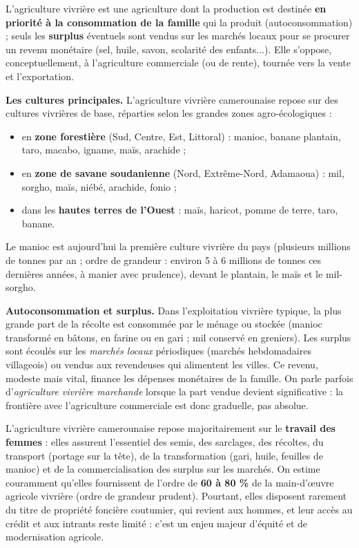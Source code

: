 \documentclass[11pt]{article}
\newcommand{\cle}[1]{{\popxbold\color{popdark}#1}}
\begin{document}
\begin{definition}
L'\cle{agriculture vivrière} est une agriculture dont la production est destinée \textbf{en priorité à la consommation de la famille} qui la produit (autoconsommation) ; seuls les \textbf{surplus} éventuels sont vendus sur les marchés locaux pour se procurer un revenu monétaire (sel, huile, savon, scolarité des enfants...). Elle s'oppose, conceptuellement, à l'agriculture commerciale (ou de rente), tournée vers la vente et l'exportation.
\end{definition}

\textbf{Les cultures principales.} L'agriculture vivrière camerounaise repose sur des cultures vivrières de base, réparties selon les grandes zones agro-écologiques :
\begin{itemize}
\item en \textbf{zone forestière} (Sud, Centre, Est, Littoral) : manioc, banane plantain, taro, macabo, igname, maïs, arachide ;
\item en \textbf{zone de savane soudanienne} (Nord, Extrême-Nord, Adamaoua) : mil, sorgho, maïs, niébé, arachide, fonio ;
\item dans les \textbf{hautes terres de l'Ouest} : maïs, haricot, pomme de terre, taro, banane.
\end{itemize}
Le \cle{manioc} est aujourd'hui la première culture vivrière du pays (plusieurs millions de tonnes par an ; ordre de grandeur : environ 5 à 6 millions de tonnes ces dernières années, à manier avec prudence), devant le plantain, le maïs et le mil-sorgho.

\textbf{Autoconsommation et surplus.} Dans l'exploitation vivrière typique, la plus grande part de la récolte est consommée par le ménage ou stockée (manioc transformé en bâtons, en farine ou en gari ; mil conservé en greniers). Les surplus sont écoulés sur les \emph{marchés locaux} périodiques (marchés hebdomadaires villageois) ou vendus aux revendeuses qui alimentent les villes. Ce revenu, modeste mais vital, finance les dépenses monétaires de la famille. On parle parfois d'\emph{agriculture vivrière marchande} lorsque la part vendue devient significative : la frontière avec l'agriculture commerciale est donc graduelle, pas absolue.

\begin{aretenir}
L'agriculture vivrière camerounaise repose majoritairement sur le \textbf{travail des femmes} : elles assurent l'essentiel des semis, des sarclages, des récoltes, du transport (portage sur la tête), de la transformation (gari, huile, feuilles de manioc) et de la commercialisation des surplus sur les marchés. On estime couramment qu'elles fournissent de l'ordre de \textbf{60 à 80 \%} de la main-d'œuvre agricole vivrière (ordre de grandeur prudent). Pourtant, elles disposent rarement du titre de propriété foncière coutumier, qui revient aux hommes, et leur accès au crédit et aux intrants reste limité : c'est un enjeu majeur d'équité et de modernisation agricole.
\end{aretenir}
\end{document}
